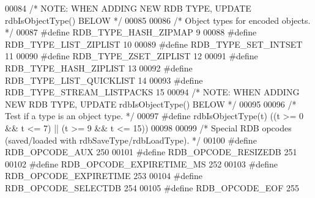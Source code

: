 \begin{DoxyCode}
00084 \textcolor{comment}{/* NOTE: WHEN ADDING NEW RDB TYPE, UPDATE rdbIsObjectType() BELOW */}
00085 
00086 \textcolor{comment}{/* Object types for encoded objects. */}
00087 \textcolor{preprocessor}{#}\textcolor{preprocessor}{define} \textcolor{preprocessor}{RDB\_TYPE\_HASH\_ZIPMAP}    9
00088 \textcolor{preprocessor}{#}\textcolor{preprocessor}{define} \textcolor{preprocessor}{RDB\_TYPE\_LIST\_ZIPLIST}  10
00089 \textcolor{preprocessor}{#}\textcolor{preprocessor}{define} \textcolor{preprocessor}{RDB\_TYPE\_SET\_INTSET}    11
00090 \textcolor{preprocessor}{#}\textcolor{preprocessor}{define} \textcolor{preprocessor}{RDB\_TYPE\_ZSET\_ZIPLIST}  12
00091 \textcolor{preprocessor}{#}\textcolor{preprocessor}{define} \textcolor{preprocessor}{RDB\_TYPE\_HASH\_ZIPLIST}  13
00092 \textcolor{preprocessor}{#}\textcolor{preprocessor}{define} \textcolor{preprocessor}{RDB\_TYPE\_LIST\_QUICKLIST} 14
00093 \textcolor{preprocessor}{#}\textcolor{preprocessor}{define} \textcolor{preprocessor}{RDB\_TYPE\_STREAM\_LISTPACKS} 15
00094 \textcolor{comment}{/* NOTE: WHEN ADDING NEW RDB TYPE, UPDATE rdbIsObjectType() BELOW */}
00095 
00096 \textcolor{comment}{/* Test if a type is an object type. */}
00097 \textcolor{preprocessor}{#}\textcolor{preprocessor}{define} \textcolor{preprocessor}{rdbIsObjectType}\textcolor{preprocessor}{(}\textcolor{preprocessor}{t}\textcolor{preprocessor}{)} \textcolor{preprocessor}{(}\textcolor{preprocessor}{(}\textcolor{preprocessor}{t} \textcolor{preprocessor}{>=} 0 \textcolor{preprocessor}{&&} \textcolor{preprocessor}{t} \textcolor{preprocessor}{<=} 7\textcolor{preprocessor}{)} \textcolor{preprocessor}{||} \textcolor{preprocessor}{(}\textcolor{preprocessor}{t} \textcolor{preprocessor}{>=} 9 \textcolor{preprocessor}{&&} \textcolor{preprocessor}{t} \textcolor{preprocessor}{<=} 15\textcolor{preprocessor}{)}\textcolor{preprocessor}{)}
00098 
00099 \textcolor{comment}{/* Special RDB opcodes (saved/loaded with rdbSaveType/rdbLoadType). */}
00100 \textcolor{preprocessor}{#}\textcolor{preprocessor}{define} \textcolor{preprocessor}{RDB\_OPCODE\_AUX}        250
00101 \textcolor{preprocessor}{#}\textcolor{preprocessor}{define} \textcolor{preprocessor}{RDB\_OPCODE\_RESIZEDB}   251
00102 \textcolor{preprocessor}{#}\textcolor{preprocessor}{define} \textcolor{preprocessor}{RDB\_OPCODE\_EXPIRETIME\_MS} 252
00103 \textcolor{preprocessor}{#}\textcolor{preprocessor}{define} \textcolor{preprocessor}{RDB\_OPCODE\_EXPIRETIME} 253
00104 \textcolor{preprocessor}{#}\textcolor{preprocessor}{define} \textcolor{preprocessor}{RDB\_OPCODE\_SELECTDB}   254
00105 \textcolor{preprocessor}{#}\textcolor{preprocessor}{define} \textcolor{preprocessor}{RDB\_OPCODE\_EOF}        255

\end{DoxyCode}

